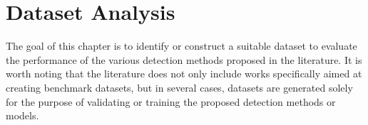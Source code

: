 \chapter{Dataset Analysis}

\justifying
The goal of this chapter is to identify or construct a suitable 
dataset to evaluate the performance of the various detection methods 
proposed in the literature. It is worth noting that the literature does 
not only include works specifically aimed at creating benchmark datasets, 
but in several cases, datasets are generated solely for the purpose of 
validating or training the proposed detection methods or models.



